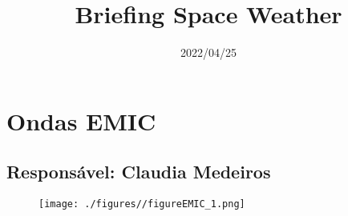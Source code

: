 \documentclass[11pt, oneside]{article}
\title{Briefing Space Weather}
\date{2022/04/25}
\begin{document}
\maketitle 

 \section{Ondas EMIC} 
 \subsection{Responsável: Claudia Medeiros} 
 
\begin{figure}[H]
    
                        \centering
   
                             \texttt{[image: ./figures//figureEMIC\_1.png]}

                        \end{figure}

                     
\end{document}
